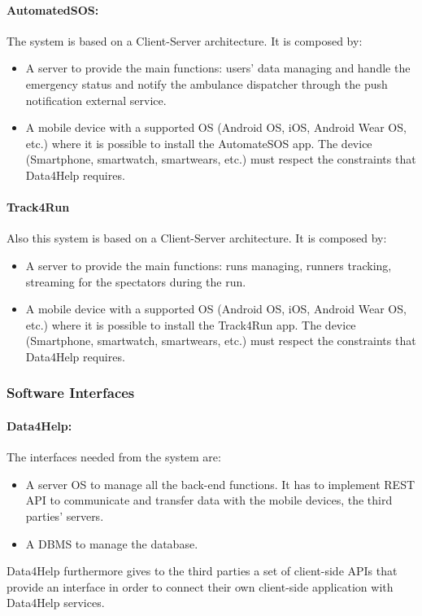 \documentclass[a4paper]{article}
\begin{document}
    \paragraph{AutomatedSOS:} The system is based on a Client-Server architecture. It is composed by:
    \begin{itemize}
        \item A server to provide the main functions: users' data managing and handle the emergency status and notify the ambulance dispatcher through the push notification external service.
        \item A mobile device with a supported OS (Android OS, iOS, Android Wear OS, etc.) where it is possible to install the AutomateSOS app. The device (Smartphone, smartwatch, smartwears, etc.) must respect the constraints that Data4Help requires.
    \end{itemize}
    
    \paragraph{Track4Run} Also this system is based on a Client-Server architecture. It is composed by:
    \begin{itemize}
        \item A server to provide the main functions: runs managing, runners tracking, streaming for the spectators during the run.
        \item A mobile device with a supported OS (Android OS, iOS, Android Wear OS, etc.) where it is possible to install the Track4Run app. The device (Smartphone, smartwatch, smartwears, etc.) must respect the constraints that Data4Help requires.
    \end{itemize}
    
    \subsubsection{Software Interfaces}
    
    \paragraph{Data4Help:} The interfaces needed from the system are:
    \begin{itemize}
        \item A server OS to manage all the back-end functions. It has to implement REST API to communicate and transfer data with the mobile devices, the third parties' servers.
        \item A DBMS to manage the database.
    \end{itemize}
    Data4Help furthermore gives to the third parties a set of client-side APIs that provide an interface in order to connect their own client-side application with Data4Help services.
    
\end{document}
